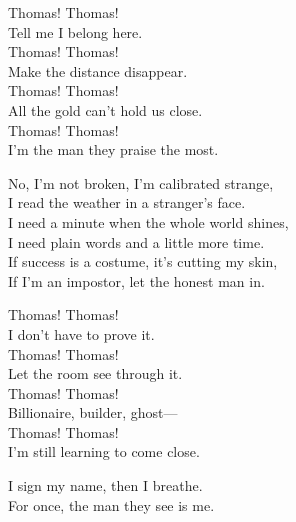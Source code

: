 \begin{lyrics}
Thomas! Thomas!\\
Tell me I belong here.\\
Thomas! Thomas!\\
Make the distance disappear.\\
Thomas! Thomas!\\
All the gold can’t hold us close.\\
Thomas! Thomas!\\
I’m the man they praise the most.

No, I’m not broken, I’m calibrated strange,\\
I read the weather in a stranger’s face.\\
I need a minute when the whole world shines,\\
I need plain words and a little more time.\\
If success is a costume, it’s cutting my skin,\\
If I’m an impostor, let the honest man in.

Thomas! Thomas!\\
I don’t have to prove it.\\
Thomas! Thomas!\\
Let the room see through it.\\
Thomas! Thomas!\\
Billionaire, builder, ghost—\\
Thomas! Thomas!\\
I’m still learning to come close.

I sign my name, then I breathe.\\
For once, the man they see is me.
\end{lyrics}

